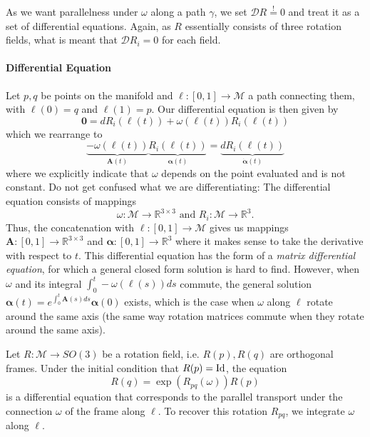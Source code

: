 \documentclass[../thesis.tex]{subfiles}
\begin{document}
As we want parallelness under $\omega$ along a path $\gamma$, we set $\mathcal{D}R \overset{!}{=}0$ and treat it as a set of
differential equations. Again, as $R$ essentially consists of 
three rotation fields, what is meant that $\mathcal{D}R_i =0$ for each field.
\paragraph{Differential Equation}
Let $p,q$ be points on the manifold and $\ell : [0,1]\to \mathcal{M}$ a path connecting them,
with $\ell(0)=q$ and $\ell(1)=p$.
Our differential equation is then given by
\begin{equation}
  \bm{0} = dR_i(\ell(t)) + \omega(\ell(t)) R_i(\ell(t))
\end{equation}
which we rearrange to
\begin{equation}
  \underbrace{-\omega (\ell(t))}_{\bm{A}(t)}  \underbrace{R_i(\ell(t))}_{\bm{\alpha}(t)} = \underbrace{dR_i(\ell(t))}_{\bm{\dot{\alpha}}(t)}
\end{equation}
where we explicitly indicate that $\omega$ depends on the point evaluated and is not constant.
Do not get confused what we are differentiating:
The differential equation consists of mappings 
$$\omega : \mathcal{M} \to \mathbb{R}^{3\times3} \text{ and }R_i : \mathcal{M}\to \mathbb{R}^3.$$
Thus, the concatenation with $\ell: [0,1] \to \mathcal{M}$ gives us mappings
$\bm{A}: [0,1] \to \mathbb{R}^{3\times 3}$ and $\bm{\alpha}:[0,1] \to \mathbb{R}^3$
where it makes sense to take the derivative with respect to $t$.
This differential equation has the form of a \emph{matrix differential equation},
for which a general closed form solution is hard to find.
However, when $\omega$ and its integral $\int_0^t-\omega(\ell(s))ds$ commute, the general solution
$\bm{\alpha}(t)= e^{\int_0^t \bm{A}(s)ds}\bm{\alpha}(0)$ exists,
which is the case when $\omega$ along $\ell$ rotate around the same axis
(the same way rotation matrices commute when they rotate around the same axis).

Let $R: \mathcal{M} \to SO(3)$ be a rotation field, i.e. $R(p), R(q)$ are orthogonal frames.
Under the initial condition that $R(p)= \operatorname{Id}$, the equation
$$R(q)= \exp(R_{pq}(\omega))R(p)$$
is a differential equation that corresponds to the parallel transport under the connection $\omega$
of the frame along $\ell$.
To recover this rotation $R_{pq}$, we integrate $\omega$ along $\ell$.
\end{document}
